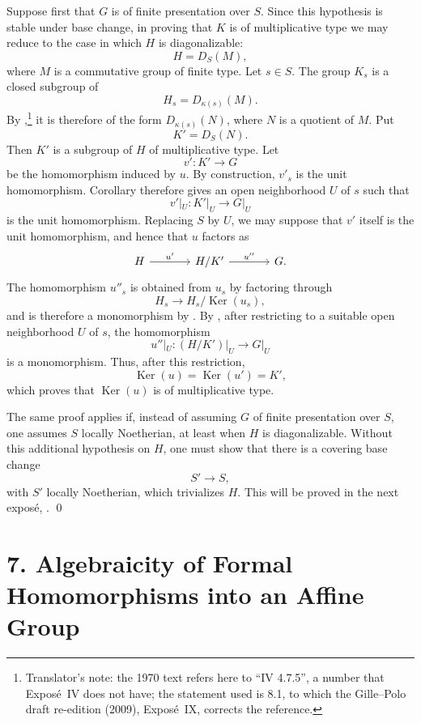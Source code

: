 Suppose first that \(G\) is of finite presentation over \(S\). Since
this hypothesis is stable under base change, in proving that \(K\) is
of multiplicative type we may reduce to the case in which \(H\) is
diagonalizable:
\[
  H=D_S(M),
\]
where \(M\) is a commutative group of finite type. Let \(s\in S\). The
group \(K_s\) is a closed subgroup of
\[
  H_s=D_{\kappa(s)}(M).
\]
By ,\footnote{Translator's note:
the 1970 text refers here to ``IV 4.7.5'', a number that Expos\'e~IV does
not have; the statement used is 8.1, to which the Gille--Polo draft
re-edition (2009), Expos\'e~IX, corrects the reference.}
it is therefore of the form \(D_{\kappa(s)}(N)\), where \(N\) is a
quotient of \(M\). Put
\[
  K'=D_S(N).
\]
Then \(K'\) is a subgroup of \(H\) of multiplicative type. Let
\[
  v':K'\longrightarrow G
\]
be the homomorphism induced by \(u\).
By construction, \(v'_s\) is the unit homomorphism. Corollary
 therefore gives an open
neighborhood \(U\) of \(s\) such that
\[
  v'|_U:K'|_U\longrightarrow G|_U
\]
is the unit homomorphism. Replacing \(S\) by \(U\), we may suppose that
\(v'\) itself is the unit homomorphism, and hence that \(u\) factors as
\[
\begin{tikzcd}[column sep=large]
  H
    \arrow[r,"u'"]
  & H/K'
    \arrow[r,"u''"]
  & G.
\end{tikzcd}
\]
The homomorphism \(u''_s\) is obtained from \(u_s\) by factoring through
\[
  H_s\longrightarrow H_s/\operatorname{Ker}(u_s),
\]
and is therefore a monomorphism by . By
, after restricting to a suitable
open neighborhood \(U\) of \(s\), the homomorphism
\[
  u''|_U:(H/K')|_U\longrightarrow G|_U
\]
is a monomorphism. Thus, after this restriction,
\[
  \operatorname{Ker}(u)
  =\operatorname{Ker}(u')
  =K',
\]
which proves that \(\operatorname{Ker}(u)\) is of multiplicative type.

The same proof applies if, instead of assuming \(G\) of finite
presentation over \(S\), one assumes \(S\) locally Noetherian, at least
when \(H\) is diagonalizable. Without this additional hypothesis on
\(H\), one must show that there is a covering base change
\[
  S'\longrightarrow S,
\]
with \(S'\) locally Noetherian, which trivializes \(H\). This will be
proved in the next expos\'e, . \qed

\section*{7. Algebraicity of Formal Homomorphisms into an Affine Group}

